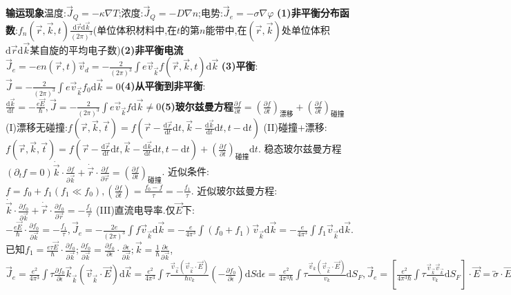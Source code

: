 \documentclass[UTF8,a4paper,10pt,twocolumn]{ctexart}
\begin{document}
  \textbf{输运现象}温度:$\vec{J}_{Q} = -\kappa\nabla T$;浓度:$\vec{J}_{Q} = -D\nabla n$;电势:$\vec{J}_{e} = -\sigma\nabla\varphi$
  \textbf{(1)非平衡分布函数}:$f_{n}(\vec{r},\vec{k},t)\frac{\mathrm{d}\vec{r}\mathrm{d}\vec{k}}{(2\pi)^{3}}$(单位体积材料中,在$t$的第$n$能带中,在$\left(\vec{r},\vec{k}\right)$处单位体积$\mathrm{d}\vec{r}\mathrm{d}\vec{k}$某自旋的平均电子数)\textbf{(2)非平衡电流}$\vec{J}_{e} = -en(\vec{r},t)\vec{v}_{d}=-\frac{2}{(2\pi)^{3}}\int e\vec{v}_{\vec{k}}f\left(\vec{r},\vec{k},t\right)\mathrm{d}\vec{k}$
  \textbf{(3)平衡}:$\vec{J} = -\frac{2}{(2\pi)^{3}}\int e\vec{v}_{\vec{k}}f_{0}\mathrm{d}\vec{k} = 0$\textbf{(4)从平衡到非平衡}:$\frac{\mathrm{d}\vec{k}}{\mathrm{d}t} = -\frac{e\vec{E}}{\hbar},\vec{J} = -\frac{2}{(2\pi)^{3}}\int e\vec{v}_{\vec{k}}f\mathrm{d}\vec{k}\neq 0$\textbf{(5)玻尔兹曼方程}$\frac{\partial f}{\partial t} = \left(\frac{\partial f}{\partial t}\right)_{\text{漂移}} + \left(\frac{\partial f}{\partial t}\right)_{\text{碰撞}}$
  (I)漂移无碰撞:$f\left(\vec{r},\vec{k},\vec{t}\right)=f\left(\vec{r}-\frac{\mathrm{d}\vec{r}}{\mathrm{d}t}\mathrm{d}t, \vec{k} - \frac{\mathrm{d}\vec{k}}{\mathrm{d}t}\mathrm{d}t, t - \mathrm{d}t\right)$
  (II)碰撞+漂移:$f\left(\vec{r},\vec{k},\vec{t}\right) = f\left(\vec{r}-\frac{\mathrm{d}\vec{r}}{\mathrm{d}t}\mathrm{d}t, \vec{k} - \frac{\mathrm{d}\vec{k}}{\mathrm{d}t}\mathrm{d}t, t - \mathrm{d}t\right) + \left(\frac{\partial f}{\partial t}\right)_{\text{碰撞}}\mathrm{d}t$.
  稳态玻尔兹曼方程$(\partial_{t}f=0)\dot{\vec{k}}\cdot\frac{\partial f}{\partial\vec{k}} + \dot{\vec{r}}\cdot\frac{\partial f}{\partial\vec{r}}=\left(\frac{\partial f}{\partial t}\right)_{\text{碰撞}}$.
  近似条件:$f = f_{0} + f_{1} (f_{1}\ll f_{0}),\left(\frac{\partial f}{\partial t}\right) = \frac{f_{0} - f}{\tau} = -\frac{f_{1}}{\tau}$.
  近似玻尔兹曼方程:$\dot{\vec{k}}\cdot\frac{\partial f_{0}}{\partial\vec{k}} + \dot{\vec{r}}\cdot\frac{\partial f_{0}}{\partial\vec{r}} = -\frac{f_{1}}{\tau}$
  (III)直流电导率.仅$\vec{E}$下:$-\frac{e\vec{E}}{\hbar}\cdot\frac{\partial f_{0}}{\partial\vec{k}} = -\frac{f_{1}}{\tau},\vec{J}_{e} = -\frac{2e}{(2\pi)^{3}}\int f\vec{v}_{\vec{k}}\mathrm{d}\vec{k} = -\frac{e}{4\pi^{3}}\int(f_{0}+f_{1})\vec{v}_{\vec{k}}\mathrm{d}\vec{k}=-\frac{e}{4\pi^{3}}\int f_{1}\vec{v}_{\vec{k}}\mathrm{d}\vec{k}$.已知$f_{1} = \frac{e\tau\vec{E}}{\hbar}\cdot\frac{\partial f_{0}}{\partial\vec{k}};\frac{\partial f_{0}}{\partial\vec{k}} = \frac{\partial f_{0}}{\partial\epsilon}\cdot\frac{\partial\epsilon}{\partial\vec{k}};\vec{k} = \frac{1}{\hbar}\frac{\partial\epsilon}{\partial\vec{k}}$,$\vec{J}_{e} = \frac{e^{2}}{4\pi^{3}}\int\tau\frac{\partial f_{0}}{\partial\epsilon}\vec{k}_{\vec{k}}(\vec{v}_{\vec{k}}\cdot\vec{E})\mathrm{d}\vec{k}=\frac{e^{2}}{4\pi^{3}}\int\tau\frac{\vec{v}_{\vec{k}}(\vec{v}_{\vec{k}}\cdot\vec{E})}{\hbar v_{k}}\left(-\frac{\partial f_{0}}{\partial\epsilon}\right)\mathrm{d}S\mathrm{d}\epsilon= \frac{e^{2}}{4\pi^{3}\hbar}\int\tau\frac{\vec{v}_{k}(\vec{v}_{\vec{k}}\cdot\vec{E})}{v_{k}}\mathrm{d}S_{F},\vec{J}_{e} = \left[\frac{e^{2}}{4\pi^{3}\hbar}\int\tau\frac{\vec{v}_{\vec{k}}\vec{v}_{\vec{k}}}{v_{k}}\mathrm{d}S_{F}\right]\cdot\vec{E}=\overleftrightarrow{\sigma}\cdot\vec{E}$
\end{document}
